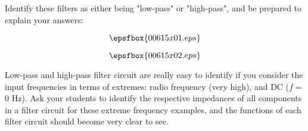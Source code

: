 

Identify these filters as either being "low-pass" or "high-pass", and be prepared to explain your answers:

$$\epsfbox{00615x01.eps}$$







$$\epsfbox{00615x02.eps}$$







Low-pass and high-pass filter circuit are really easy to identify if you consider the input frequencies in terms of extremes: radio frequency (very high), and DC ($f =$ 0 Hz).  Ask your students to identify the respective impedances of all components in a filter circuit for these extreme frequency examples, and the functions of each filter circuit should become very clear to see.




